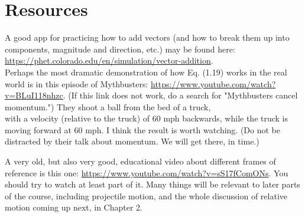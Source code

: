 \documentclass[10pt]{article}
\begin{document}
\section*{Resources}
A good app for practicing how to add vectors (and how to break them up into components, magnitude and direction, etc.) may be found here:\\
\href{https://phet.colorado.edu/en/simulation/vector-addition}{https://phet.colorado.edu/en/simulation/vector-addition}.\\
Perhaps the most dramatic demonstration of how Eq. (1.19) works in the real world is in this episode of Mythbusters: \href{https://www.youtube.com/watch?v=BLuI118nhzc}{https://www.youtube.com/watch?v=BLuI118nhzc}. (If this link does not work, do a search for "Mythbusters cancel momentum.") They shoot a ball from the bed of a truck,\\
with a velocity (relative to the truck) of 60 mph backwards, while the truck is moving forward at 60 mph. I think the result is worth watching. (Do not be distracted by their talk about momentum. We will get there, in time.)

A very old, but also very good, educational video about different frames of reference is this one: \href{https://www.youtube.com/watch?v=sS17fComONs}{https://www.youtube.com/watch?v=sS17fComONs}. You should try to watch at least part of it. Many things will be relevant to later parts of the course, including projectile motion, and the whole discussion of relative motion coming up next, in Chapter 2.
\end{document}
